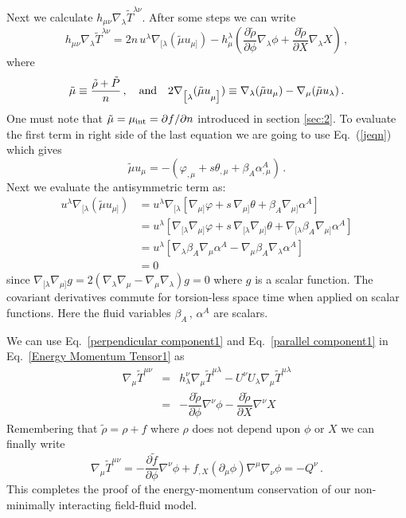 \documentclass[a4paper,12pt]{article}
\newcommand{\ti}[1]{\ensuremath{ \tilde{#1}}}
\newcommand{\nb}{\ensuremath{ \nabla }}
\newcommand{\m}{\ensuremath{{\mu \nu}}}
\newcommand{\p}{\ensuremath{\partial{}}}
\begin{document}
Next we calculate $h_{\m}\nb_{\lambda}\ti{T}^{\lambda \nu}$. After some steps we can write
\begin{equation}\label{parallel component1}
h_{\m}\nb_{\lambda}\ti{T}^{\lambda \nu}	 = 2n\,u^{\lambda}\nb_{\big[\lambda}(\ti{\mu}u_{\mu\big]})-h^{\lambda}_{\mu}\left( \dfrac{\p\ti{\rho}}{\p \phi}\nb_{\lambda}\phi + \dfrac{\p\ti{\rho}}{\p X}\nb_{\lambda}X\right)\,, 
\end{equation}
where
$$\tilde{\mu}\equiv\frac{\tilde{\rho}+\tilde{P}}{n}\,,\quad {\rm and} \quad
2\nb_{\big[\lambda}(\ti{\mu}u_{\mu\big]})\equiv \nabla_\lambda(\tilde{\mu}u_\mu)-
\nabla_\mu(\tilde{\mu}u_\lambda)\,.$$
One must note that $\tilde{\mu}=\mu_{\rm int}={\p f}/{\p n}$ introduced in section \ref{sec:2}. To evaluate the first term in right side of the last equation  we are going to use 
Eq.~(\ref{jeqn}) which gives
\begin{equation}\label{}
\ti{\mu}u_{\mu} = -\left( \varphi_{,\mu} +s \theta_{,\mu} +\beta_{A} \alpha_{,\mu}^{A}\right)\,. 
\end{equation}
Next we evaluate the antisymmetric term as:
\begin{equation}\label{}
\begin{split}
u^{\lambda}\nb_{\big[\lambda}(\ti{\mu}u_{\mu\big]})& = u^{\lambda}\nb_{\big[\lambda}\left[ \nb_{\mu\big]}\varphi + s\,\nb_{\mu\big]} \theta + 	\beta_{A}\nb_{\mu\big]} \alpha^{A}			\right]  \\
& = u^{\lambda}\left[\nb_{\big[\lambda} \nb_{\mu\big]}\varphi + s\, \nb_{\big[\lambda}\nb_{\mu\big]}\theta + \nb_{\big[\lambda} \beta_{A} \nb_{\mu\big]} \alpha^{A}\right] \\
& = u^{\lambda}\left[\nb_{\lambda}\beta_{A}\nb_{\mu}\alpha^{A} - \nb_{\mu}\beta_{A}\nb_{\lambda}\alpha^{A} \right] \\
& =0
\end{split}
\end{equation}
since $\nb_{\big[\lambda}\nb_{\mu\big]}g = 2(\nb_{\lambda} \nb_{\mu} - \nb_{\mu} \nb_{\lambda})g = 0$ where $g$ is a scalar function. The covariant derivatives commute for torsion-less space time when applied on scalar functions. Here the fluid variables $\beta_{A} \, , \, \alpha^{A}$ are scalars.

We can use Eq.~\eqref{perpendicular component1} and Eq.~\eqref{parallel component1} in Eq.~\eqref{Energy Momentum Tensor1} as
\begin{eqnarray}\label{}
\nb_{\mu}\ti{T}^{\m} & = & h^{\nu}_{\lambda}\nb_{\mu}\ti{T}^{\mu \lambda} - U^{\nu}U_{\lambda}\nb_{\mu}\ti{T}^{\mu \lambda} \\
& = & -\dfrac{\p \ti{\rho}}{\p \phi}\nb^{\nu}\phi  - \dfrac{\p \ti{\rho}}{\p X}\nb^{\nu}X\,
\end{eqnarray}
Remembering that $\tilde{\rho}=\rho +f$ where $\rho$ does not depend upon $\phi$ or
$X$ we can finally write
\begin{equation}\label{final fluid conservation1}
\nb_{\mu}\ti{T}^{\m} =-\dfrac{\p \ti{f}}{\p \phi}\nb^{\nu}\phi + f_{,X}(\partial_{\mu}\phi) \nabla^{\mu} \nabla_{\nu} \phi = -Q^{\nu}\,.
\end{equation}
This completes the proof of the energy-momentum conservation of our non-minimally interacting field-fluid model.
\end{document}
